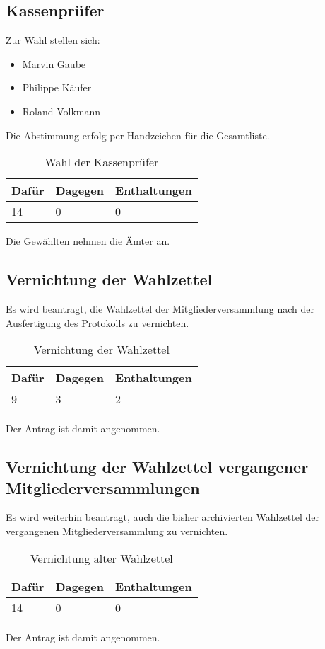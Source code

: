 \documentclass[a4paper]{scrartcl}
\begin{document}
\subsection{Kassenprüfer}
Zur Wahl stellen sich:
\begin{itemize}
\item Marvin Gaube
\item Philippe Käufer
\item Roland Volkmann
\end{itemize}
Die Abstimmung erfolg per Handzeichen für die Gesamtliste.
\begin{table}[H]
\begin{tabularx}{\textwidth}{XXX}
Dafür & Dagegen & Enthaltungen\\
\toprule
14 & 0 & 0\\
\end{tabularx}
\caption{Wahl der Kassenprüfer}
\end{table}
Die Gewählten nehmen die Ämter an.

\subsection{Vernichtung der Wahlzettel}
Es wird beantragt, die Wahlzettel der Mitgliederversammlung nach der Ausfertigung des Protokolls zu vernichten.
\begin{table}[H]
\begin{tabularx}{\textwidth}{XXX}
Dafür & Dagegen & Enthaltungen\\
\toprule
9 & 3 & 2\\
\end{tabularx}
\caption{Vernichtung der Wahlzettel}
\end{table}
Der Antrag ist damit angenommen.

\subsection{Vernichtung der Wahlzettel vergangener Mitgliederversammlungen}
Es wird weiterhin beantragt, auch die bisher archivierten Wahlzettel der vergangenen Mitgliederversammlung zu vernichten.
\begin{table}[H]
\begin{tabularx}{\textwidth}{XXX}
Dafür & Dagegen & Enthaltungen\\
\toprule
14 & 0 & 0\\
\end{tabularx}
\caption{Vernichtung alter Wahlzettel}
\end{table}
Der Antrag ist damit angenommen.
\end{document}
